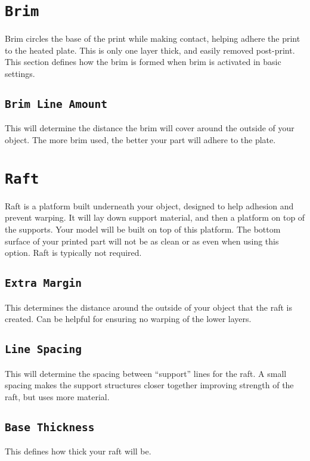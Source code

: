 \section{\texttt{Brim}}
Brim circles the base of the print while making contact, helping adhere the print to the heated plate. This is only one layer thick, and easily removed post-print. This section defines how the brim is formed when brim is activated in basic settings.

\subsection{\texttt{Brim Line Amount}}
This will determine the distance the brim will cover around the outside of your object. The more brim used, the better your part will adhere to the plate. 

\section{\texttt{Raft}}
Raft is a platform built underneath your object, designed to help adhesion and prevent warping. It will lay down support material, and then a platform on top of the supports. Your model will be built on top of this platform. The bottom surface of your printed part will not be as clean or as even when using this option. Raft is typically not required.

\subsection{\texttt{Extra Margin}}
This determines the distance around the outside of your object that the raft is created. Can be helpful for ensuring no warping of the lower layers.

\subsection{\texttt{Line Spacing}}
This will determine the spacing between “support” lines for the raft. A small spacing makes the support structures closer together improving strength of the raft, but uses more material.

\subsection{\texttt{Base Thickness}}
This defines how thick your raft will be.

